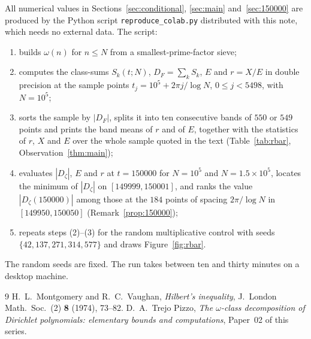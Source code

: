 \documentclass[11pt]{amsart}
\theoremstyle{definition}
\theoremstyle{remark}
\begin{document}
All numerical values in Sections~\ref{sec:conditional}, \ref{sec:main}
and~\ref{sec:150000} are produced by the Python script
\texttt{reproduce\_colab.py} distributed with this note, which needs no
external data. The script:
\begin{enumerate}[label=(\arabic*)]
\item builds $\omega(n)$ for $n\le N$ from a smallest-prime-factor sieve;
\item computes the class-sums $S_k(t;N)$, $D_F=\sum_kS_k$, $E$ and
$r=X/E$ in double precision at the sample points
$t_j=10^5+2\pi j/\log N$, $0\le j<5498$, with $N=10^5$;
\item sorts the sample by $|D_F|$, splits it into ten consecutive bands of
$550$ or $549$ points and prints the band means of $r$ and of $E$, together with the
statistics of $r$, $X$ and $E$ over the whole sample quoted in the text
(Table~\ref{tab:rbar}, Observation~\ref{thm:main});
\item evaluates $|D_\zeta|$, $E$ and $r$ at $t=150000$ for $N=10^5$ and
$N=1.5\times10^5$, locates the minimum of $|D_\zeta|$ on $[149999,150001]$, and ranks
the value $|D_\zeta(150000)|$ among those at the $184$ points of spacing
$2\pi/\log N$ in $[149950,150050]$ (Remark~\ref{prop:150000});
\item repeats steps (2)--(3) for the random multiplicative control with
seeds $\{42,137,271,314,577\}$ and draws Figure~\ref{fig:rbar}.
\end{enumerate}
The random seeds are fixed. The run takes between ten and thirty minutes on a
desktop machine.

\begin{thebibliography}{9}
 H.~L.~Montgomery and R.~C.~Vaughan, \emph{Hilbert's
inequality}, J.~London Math.\ Soc.~(2) \textbf{8} (1974), 73--82.
 D.~A.~Trejo Pizzo, \emph{The $\omega$-class decomposition
of Dirichlet polynomials: elementary bounds and computations},
Paper~02 of this series.
\end{thebibliography}
\end{document}
